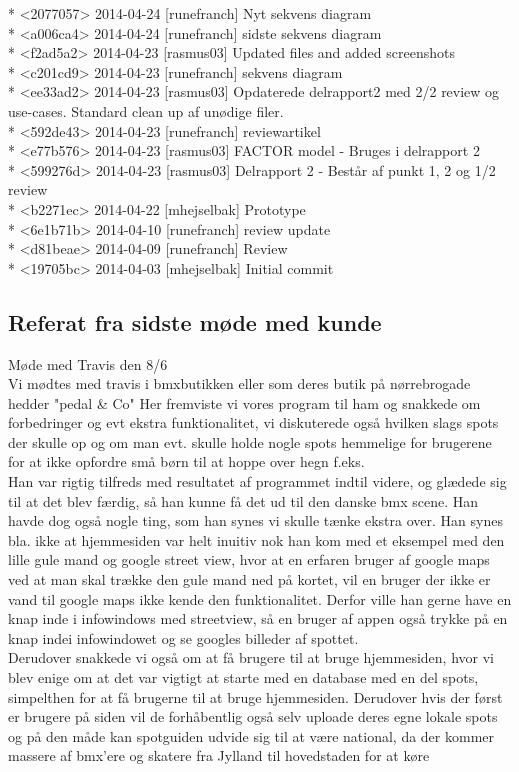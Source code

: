 \documentclass[12pt]{article}
\begin{document}
* <2077057> 2014-04-24 [runefranch]  Nyt sekvens diagram\\
* <a006ca4> 2014-04-24 [runefranch]  sidste sekvens diagram\\
* <f2ad5a2> 2014-04-23 [rasmus03]  Updated files and added screenshots\\
* <c201cd9> 2014-04-23 [runefranch]  sekvens diagram\\
* <ee33ad2> 2014-04-23 [rasmus03]  Opdaterede delrapport2 med 2/2 review og use-cases. Standard clean up af unødige filer.\\
* <592de43> 2014-04-23 [runefranch]  reviewartikel \\
* <e77b576> 2014-04-23 [rasmus03]  FACTOR model - Bruges i delrapport 2\\
* <599276d> 2014-04-23 [rasmus03]  Delrapport 2 - Består af punkt 1, 2 og 1/2 review\\
* <b2271ec> 2014-04-22 [mhejselbak]  Prototype\\
* <6e1b71b> 2014-04-10 [runefranch]  review update\\
* <d81beae> 2014-04-09 [runefranch]  Review\\
* <19705bc> 2014-04-03 [mhejselbak]  Initial commit\\
\subsection*{Referat fra sidste møde med kunde}
Møde med Travis den 8/6 \\
Vi mødtes med travis i bmxbutikken eller som deres butik på nørrebrogade hedder "pedal \& Co" Her fremviste vi vores program til ham og snakkede om forbedringer og evt ekstra funktionalitet, vi diskuterede også hvilken slags spots der skulle op og om man evt. skulle holde nogle spots hemmelige for brugerene for at ikke opfordre små børn til at hoppe over hegn f.eks.\\
Han var rigtig tilfreds med resultatet af programmet indtil videre, og glædede sig til at det blev færdig, så han kunne få det ud til den danske bmx scene. Han havde dog også nogle ting, som han synes vi skulle tænke ekstra over. Han synes bla. ikke at hjemmesiden var helt inuitiv nok han kom med et eksempel med den lille gule mand og google street view, hvor at en erfaren bruger af google maps ved at man skal trække den gule mand ned på kortet, vil en bruger der ikke er vand til google maps ikke kende den funktionalitet. Derfor ville han gerne have en knap inde i infowindows med streetview, så en bruger af appen også trykke på en knap indei  infowindowet og se googles billeder af spottet.\\
Derudover snakkede vi også om at få brugere til at bruge hjemmesiden, hvor vi blev enige om at det var vigtigt at starte med en database med en del spots, simpelthen for at få brugerne til at bruge hjemmesiden. Derudover hvis der først er brugere på siden vil de forhåbentlig også selv uploade deres egne lokale spots og på den måde kan spotguiden udvide sig til at være national, da der kommer massere af bmx'ere og skatere fra Jylland til hovedstaden for at køre
\end{document}
